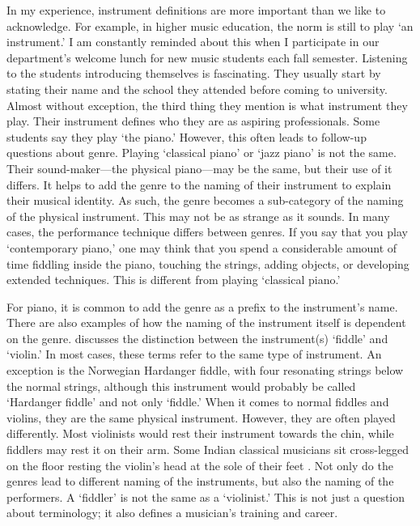 In my experience, instrument definitions are more important than we like to acknowledge. For example, in higher music education, the norm is still to play `an instrument.' I am constantly reminded about this when I participate in our department's welcome lunch for new music students each fall semester. Listening to the students introducing themselves is fascinating. They usually start by stating their name and the school they attended before coming to university. Almost without exception, the third thing they mention is what instrument they play. Their instrument defines who they are as aspiring professionals.
Some students say they play `the piano.' However, this often leads to follow-up questions about genre. Playing `classical piano' or `jazz piano' is not the same. Their sound-maker---the physical piano---may be the same, but their use of it differs. It helps to add the genre to the naming of their instrument to explain their musical identity. As such, the genre becomes a sub-category of the naming of the physical instrument. This may not be as strange as it sounds. In many cases, the performance technique differs between genres. If you say that you play `contemporary piano,' one may think that you spend a considerable amount of time fiddling inside the piano, touching the strings, adding objects, or developing extended techniques. This is different from playing `classical piano.'

For piano, it is common to add the genre as a prefix to the instrument's name. There are also examples of how the naming of the instrument itself is dependent on the genre. \citet{kvifte_instruments_1989} discusses the distinction between the instrument(s) `fiddle' and `violin.' In most cases, these terms refer to the same type of instrument. An exception is the Norwegian Hardanger fiddle, with four resonating strings below the normal strings, although this instrument would probably be called `Hardanger fiddle' and not only `fiddle.' When it comes to normal fiddles and violins, they are the same physical instrument. However, they are often played differently. Most violinists would rest their instrument towards the chin, while fiddlers may rest it on their arm. Some Indian classical musicians sit cross-legged on the floor resting the violin's head at the sole of their feet \citep{magnusson_migration_2021}. Not only do the genres lead to different naming of the instruments, but also the naming of the performers. A `fiddler' is not the same as a `violinist.' This is not just a question about terminology; it also defines a musician's training and career.

